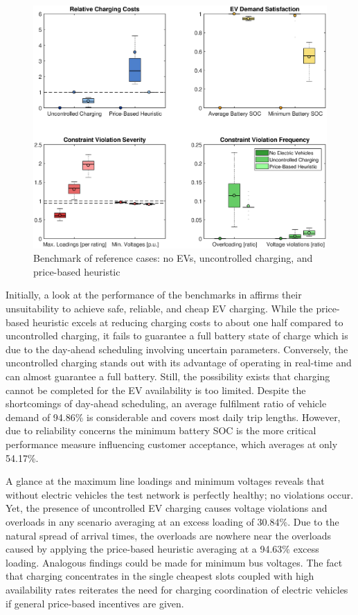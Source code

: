 \begin{figure}[]
	\includegraphics[width=\textwidth,trim={3cm 1.5cm 2.5cm 0cm},clip]{figures/evaluation/refcases.eps}
	\caption{Benchmark of reference cases: no EVs, uncontrolled charging, and price-based heuristic}
	\label{fig:refcases}
\end{figure}

Initially, a look at the performance of the benchmarks in  affirms their unsuitability to achieve safe, reliable, and cheap EV charging. While the price-based heuristic excels at reducing charging costs to about one half compared to uncontrolled charging, it fails to guarantee a full battery state of charge which is due to the day-ahead scheduling involving uncertain parameters. Conversely, the uncontrolled charging stands out with its advantage of operating in real-time and can almost guarantee a full battery. Still, the possibility exists that charging cannot be completed for the EV availability is too limited. Despite the shortcomings of day-ahead scheduling, an average fulfilment ratio of vehicle demand of 94.86\% is considerable and covers most daily trip lengths. However, due to reliability concerns the minimum battery SOC is the more critical performance measure influencing customer acceptance, which averages at only 54.17\%.

\newpage
A glance at the maximum line loadings and minimum voltages reveals that without electric vehicles the test network is perfectly healthy; no violations occur. Yet, the presence of uncontrolled EV charging causes voltage violations and overloads in any scenario averaging at an excess loading of 30.84\%. Due to the natural spread of arrival times, the overloads are nowhere near the overloads caused by applying the price-based heuristic averaging at a 94.63\% excess loading. Analogous findings could be made for minimum bus voltages. The fact that charging concentrates in the single cheapest slots coupled with high availability rates reiterates the need for charging coordination of electric vehicles if general price-based incentives are given.

